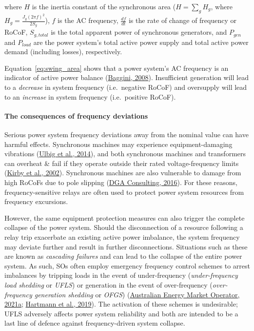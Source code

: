 \documentclass[12pt,a4paper,]{report}
\begin{document}
where \(H\) is the inertia constant of the synchronous area
(\(H=\sum_{g} H_g\), where \(H_g = \frac{J_g(2\pi f)^2}{2S_g}\)), \(f\)
is the AC frequency, \(\frac{df}{dt}\) is the rate of change of
frequency or RoCoF, \(S_{g,total}\) is the total apparent power of
synchronous generators, and \(P_{gen}\) and \(P_{load}\) are the power
system's total active power supply and total active power demand
(including losses), respectively.

Equation~\ref{eq:swing_area} shows that a power system's AC frequency is
an indicator of active power balance
(\protect\hyperlink{ref-bagginiHandbookPowerQuality2008}{Baggini,
2008}). Insufficient generation will lead to a \emph{decrease} in system
frequency (i.e.~negative RoCoF) and oversupply will lead to an
\emph{increase} in system frequency (i.e.~positive RoCoF).

\hypertarget{sec:lit_review-balancing_need-consequences}{%
\paragraph{The consequences of frequency
deviations}\label{sec:lit_review-balancing_need-consequences}}

Serious power system frequency deviations away from the nominal value
can have harmful effects. Synchronous machines may experience
equipment-damaging vibrations
(\protect\hyperlink{ref-ulbigImpactLowRotational2014}{Ulbig et al.,
2014}), and both synchronous machines and transformers can overheat \&
fail if they operate outside their rated voltage-frequency limits
(\protect\hyperlink{ref-kirbyFrequencyControlConcerns2002}{Kirby et al.,
2002}). Synchronous machines are also vulnerable to damage from high
RoCoFs due to pole slipping
(\protect\hyperlink{ref-dgaconsultingInternationalReviewFrequency2016}{DGA
Consulting, 2016}). For these reasons, frequency-sensitive relays are
often used to protect power system resources from frequency excursions.

However, the same equipment protection measures can also trigger the
complete collapse of the power system. Should the disconnection of a
resource following a relay trip exacerbate an existing active power
imbalance, the system frequency may deviate further and result in
further disconnections. Situations such as these are known as
\emph{cascading failures} and can lead to the collapse of the entire
power system. As such, SOs often employ emergency frequency control
schemes to arrest imbalances by tripping loads in the event of
under-frequency (\emph{under-frequency load shedding} or \emph{UFLS}) or
generation in the event of over-frequency (\emph{over-frequency
generation shedding} or \emph{OFGS})
(\protect\hyperlink{ref-australianenergymarketoperatorEnduringPrimaryFrequency2021}{Australian
Energy Market Operator, 2021a};
\protect\hyperlink{ref-hartmannEffectsDecreasingSynchronous2019}{Hartmann
et al., 2019}). The activation of these schemes is undesirable; UFLS
adversely affects power system reliability and both are intended to be a
last line of defence against frequency-driven system collapse.
\end{document}
